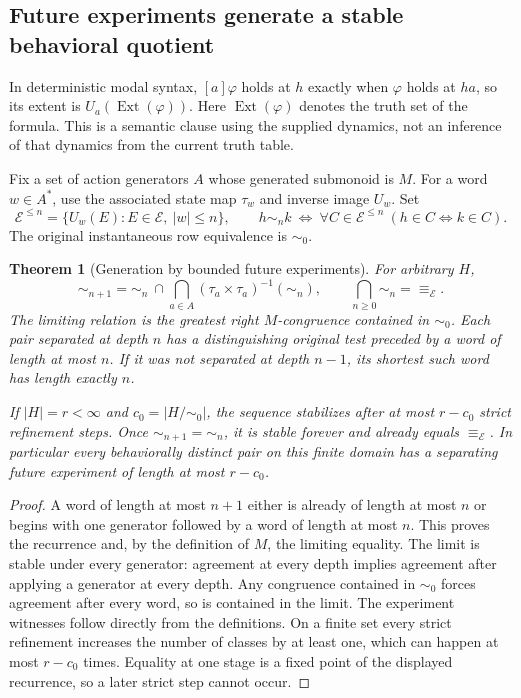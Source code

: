 \documentclass[11pt]{article}
\newtheorem{theorem}{Theorem}[section]
\theoremstyle{definition}
\begin{document}
\subsection{Future experiments generate a stable behavioral quotient}

In deterministic modal syntax, $[a]\varphi$ holds at $h$ exactly when
$\varphi$ holds at $ha$, so its extent is $U_a(\operatorname{Ext}(\varphi))$.
Here $\operatorname{Ext}(\varphi)$ denotes the truth set of the formula.
This is a semantic clause using the supplied dynamics, not an inference
of that dynamics from the current truth table.

Fix a set of action generators $A$ whose generated submonoid is $M$.
For a word $w\in A^*$, use the associated state map $\tau_w$ and inverse
image $U_w$. Set
\[
 \mathcal E^{\le n}=\{U_w(E):E\in\mathcal E,\ |w|\le n\},\qquad
 h\sim_n k\ \Longleftrightarrow\
 \forall C\in\mathcal E^{\le n}\ (h\in C\Longleftrightarrow k\in C).
\]
The original instantaneous row equivalence is $\sim_0$.

\begin{theorem}[Generation by bounded future experiments]\label{thm:future}
For arbitrary $H$,
\[
 \sim_{n+1}=\sim_n\ \cap\!
 \bigcap_{a\in A}(\tau_a\times\tau_a)^{-1}(\sim_n),\qquad
 \bigcap_{n\ge0}\sim_n=\equiv_{\mathcal E}.
\]
The limiting relation is the greatest right $M$-congruence contained in
$\sim_0$. Each pair separated at depth $n$ has a distinguishing original
test preceded by a word of length at most $n$. If it was not separated
at depth $n-1$, its shortest such word has length exactly $n$.

If $|H|=r<\infty$ and $c_0=|H/{\sim_0}|$, the sequence stabilizes after
at most $r-c_0$ strict refinement steps. Once $\sim_{n+1}=\sim_n$, it is
stable forever and already equals $\equiv_{\mathcal E}$. In particular
every behaviorally distinct pair on this finite domain has a separating
future experiment of length at most $r-c_0$.
\end{theorem}

\begin{proof}
A word of length at most $n+1$ either is already of length at most $n$ or
begins with one generator followed by a word of length at most $n$.
This proves the recurrence and, by the definition of $M$, the limiting
equality. The limit is stable under every generator: agreement at every
depth implies agreement after applying a generator at every depth.
Any congruence contained in $\sim_0$ forces agreement after every word,
so is contained in the limit. The experiment witnesses follow directly
from the definitions. On a finite set every strict refinement increases
the number of classes by at least one, which can happen at most
$r-c_0$ times. Equality at one stage is a fixed point of the displayed
recurrence, so a later strict step cannot occur.
\end{proof}
\end{document}
